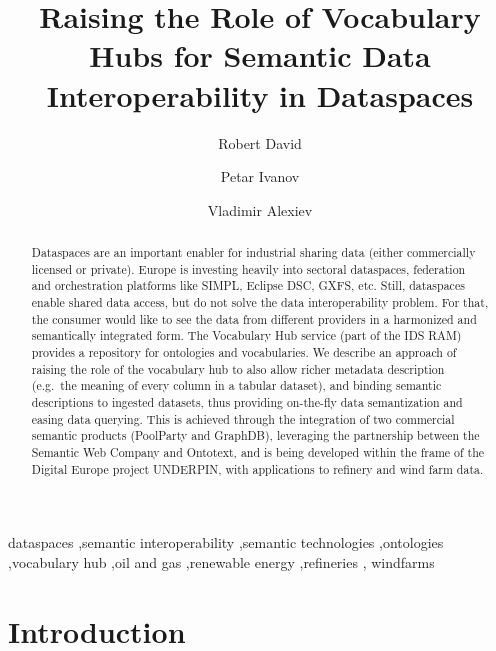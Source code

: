 \documentclass[
  super,
  preprint,
  3p]{elsarticle}
\begin{document}
\begin{frontmatter}
\title{Raising the Role of Vocabulary Hubs for Semantic Data
Interoperability in Dataspaces}
\author[1]{Robert David%
%
}
\author[2]{Petar Ivanov%
%
}
\author[2]{Vladimir Alexiev%
%
}





        
\begin{abstract}
Dataspaces are an important enabler for industrial sharing data (either
commercially licensed or private). Europe is investing heavily into
sectoral dataspaces, federation and orchestration platforms like SIMPL,
Eclipse DSC, GXFS, etc. Still, dataspaces enable shared data access, but
do not solve the data interoperability problem. For that, the consumer
would like to see the data from different providers in a harmonized and
semantically integrated form. The Vocabulary Hub service (part of the
IDS RAM) provides a repository for ontologies and vocabularies. We
describe an approach of raising the role of the vocabulary hub to also
allow richer metadata description (e.g.~the meaning of every column in a
tabular dataset), and binding semantic descriptions to ingested
datasets, thus providing on-the-fly data semantization and easing data
querying. This is achieved through the integration of two commercial
semantic products (PoolParty and GraphDB), leveraging the partnership
between the Semantic Web Company and Ontotext, and is being developed
within the frame of the Digital Europe project UNDERPIN, with
applications to refinery and wind farm data.
\end{abstract}





\begin{keyword}
    dataspaces \sep semantic interoperability \sep semantic
technologies \sep ontologies \sep vocabulary hub \sep oil and
gas \sep renewable energy \sep refineries \sep 
    windfarms
\end{keyword}
\end{frontmatter}
    
\section{Introduction}\label{introduction}
\end{document}
